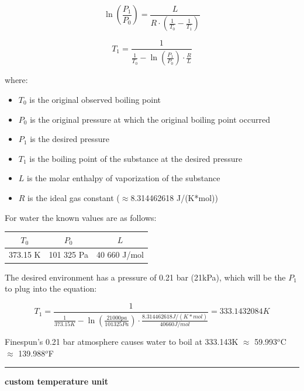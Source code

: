 \documentclass[a4paper]{article}
\begin{document}
	$$ \ln\left(\frac{P_1}{P_0}\right) = \frac{L}{R \cdot (\frac{1}{T_0} - \frac{1}{T_1}) } $$
	
	$$ T_1 = \frac{1}{\frac{1}{T_0} - \ln\left(\frac{P_1}{P_0}\right) \cdot \frac{R}{L}} $$
	
	where:
	
	\begin{itemize}
		\item $T_0$ is the original observed boiling point
		
		\item $P_0$ is the original pressure at which the original boiling point occurred
		
		\item $P_1$ is the desired pressure
		
		\item $T_1$ is the boiling point of the substance at the desired pressure
		
		\item $L$ is the molar enthalpy of vaporization of the substance
		
		\item $R$ is the ideal gas constant ($\approx$8.314462618 J/(K*mol))
	\end{itemize}
	
	\begin{center}
		For water the known values are as follows:
		
		\begin{tabular}{c | c | c }
			$T_0$ & $P_0$ & $L$ \\\hline
			373.15 K & 101 325 Pa & 40 660 J/mol
		\end{tabular}
	\end{center}
	
	The desired environment has a pressure of 0.21 bar (21kPa), which will be the $P_1$ to plug into the equation:
	
	$$ T_1 = \frac{1}{\frac{1}{373.15 K} - \ln\left(\frac{21 000 pa}{101 325 Pa}\right) \cdot \frac{8.314462618 J/(K*mol)}{40 660 J/mol}} = 333.1432084 K$$
	
	Finespun's 0.21 bar atmosphere causes water to boil at 333.143K $\approx$ 59.993$^o$C $\approx$ 139.988$^o$F
	
	\bigskip
	
	\begin{center}
		\rule{0.8\linewidth}{1pt}
		
		\textbf{custom temperature unit}
	\end{center}
	
\end{document}
